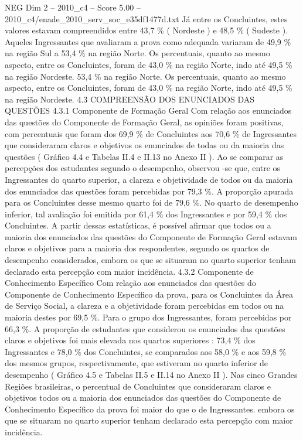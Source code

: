 \begin{textsample}{NEG Dim 2 – 2010\_c4 – Score 5.00 – 2010\_c4/enade\_2010\_serv\_soc\_e35df1477d.txt}
Já entre os Concluintes, estes valores estavam compreendidos entre 43,7 \% ( Nordeste ) e 48,5 \% ( Sudeste ).
Aqueles Ingressantes que avaliaram a prova como adequada variaram de 49,9 \% na região Sul a 53,4 \% na região Norte.
Os percentuais, quanto ao mesmo aspecto, entre os Concluintes, foram de 43,0 \% na região Norte, indo até 49,5 \% na região Nordeste. 53,4 \% na região Norte.
Os percentuais, quanto ao mesmo aspecto, entre os Concluintes, foram de 43,0 \% na região Norte, indo até 49,5 \% na região Nordeste. 4.3 COMPREENSÃO DOS ENUNCIADOS DAS QUESTÕES 4.3.1 Componente de Formação Geral Com relação aos enunciados das questões do Componente de Formação Geral, as opiniões foram positivas, com percentuais que foram dos 69,9 \% de Concluintes aos 70,6 \% de Ingressantes que consideraram claros e objetivos os enunciados de todas ou da maioria das questões ( Gráfico 4.4 e Tabelas II.4 e II.13 no Anexo II ).
Ao se comparar as percepções dos estudantes segundo o desempenho, observou -se que, entre os Ingressantes do quarto superior, a clareza e objetividade de todos ou da maioria dos enunciados das questões foram percebidas por 79,3 \%.
A proporção apurada para os Concluintes desse mesmo quarto foi de 79,6 \%.
No quarto de desempenho inferior, tal avaliação foi emitida por 61,4 \% dos Ingressantes e por 59,4 \% dos Concluintes.
A partir dessas estatísticas, é possível afirmar que todos ou a maioria dos enunciados das questões do Componente de Formação Geral estavam claros e objetivos para a maioria dos respondentes, segundo os quartos de desempenho considerados, embora os que se situaram no quarto superior tenham declarado esta percepção com maior incidência. 4.3.2 Componente de Conhecimento Específico Com relação aos enunciados das questões do Componente de Conhecimento Específico da prova, para os Concluintes da Área de Serviço Social, a clareza e a objetividade foram percebidas em todos ou na maioria destes por 69,5 \%.
Para o grupo dos Ingressantes, foram percebidas por 66,3 \%.
A proporção de estudantes que considerou os enunciados das questões claros e objetivos foi mais elevada nos quartos superiores : 73,4 \% dos Ingressantes e 78,0 \% dos Concluintes, se comparados aos 58,0 \% e aos 59,8 \% dos mesmos grupos, respectivamente, que estiveram no quarto inferior de desempenho ( Gráfico 4.5 e Tabelas II.5 e II.14 no Anexo II ).
Nas cinco Grandes Regiões brasileiras, o percentual de Concluintes que consideraram claros e objetivos todos ou a maioria dos enunciados das questões do Componente de Conhecimento Específico da prova foi maior do que o de Ingressantes. embora os que se situaram no quarto superior tenham declarado esta percepção com maior incidência.

\end{textsample}
